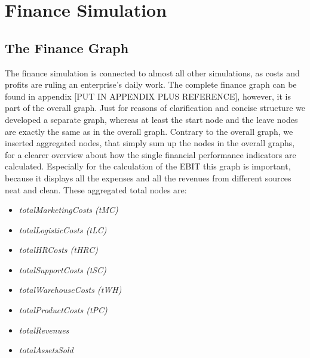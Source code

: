 \section{Finance Simulation}
\label{sec:finance_simulation}

\subsection{The Finance Graph}
The finance simulation is connected to almost all other simulations, as costs and profits are ruling an enterprise's daily work. The complete finance graph can be found in appendix [PUT IN APPENDIX PLUS REFERENCE], however, it is part of the overall graph. Just for reasons of clarification and concise structure we developed a separate graph, whereas at least the start node and the leave nodes are exactly the same as in the overall graph. Contrary to the overall graph, we inserted aggregated nodes, that simply sum up the nodes in the overall graphs, for a clearer overview about how the single financial performance indicators are calculated. Especially for the calculation of the \gls{EBIT} this graph is important, because it displays all the expenses and all the revenues from different sources neat and clean. These aggregated total nodes are:
\begin{itemize}
    \item \textit{totalMarketingCosts (tMC)}
    \item \textit{totalLogisticCosts (tLC)}
    \item \textit{totalHRCosts (tHRC)}
    \item \textit{totalSupportCosts (tSC)}
    \item \textit{totalWarehouseCosts (tWH)}
    \item \textit{totalProductCosts (tPC)}
    \item \textit{totalRevenues}
    \item \textit{totalAssetsSold}
\end{itemize}


